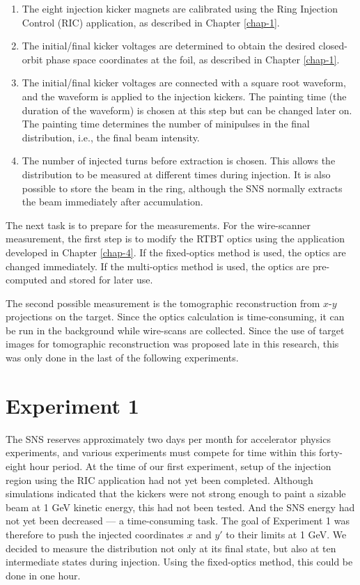 \begin{enumerate}
    \item
    The eight injection kicker magnets are calibrated using the Ring Injection Control (RIC) application, as described in Chapter \ref{chap-1}. 
    \item
    The initial/final kicker voltages are determined to obtain the desired closed-orbit phase space coordinates at the foil, as described in Chapter \ref{chap-1}.
    \item
    The initial/final kicker voltages are connected with a square root waveform, and the waveform is applied to the injection kickers. The painting time (the duration of the waveform) is chosen at this step but can be changed later on. The painting time determines the number of minipulses in the final distribution, i.e., the final beam intensity.
    \item
    The number of injected turns before extraction is chosen. This allows the distribution to be measured at different times during injection. It is also possible to store the beam in the ring, although the SNS normally extracts the beam immediately after accumulation.
\end{enumerate}
%
The next task is to prepare for the measurements. For the wire-scanner measurement, the first step is to modify the RTBT optics using the application developed in Chapter \ref{chap-4}. If the fixed-optics method is used, the optics are changed immediately. If the multi-optics method is used, the optics are pre-computed and stored for later use. 

The second possible measurement is the tomographic reconstruction from $x$-$y$ projections on the target. Since the optics calculation is time-consuming, it can be run in the background while wire-scans are collected. Since the use of target images for tomographic reconstruction was proposed late in this research, this was only done in the last of the following experiments.


\section{Experiment 1}

The SNS reserves approximately two days per month for accelerator physics experiments, and various experiments must compete for time within this forty-eight hour period. At the time of our first experiment, setup of the injection region using the RIC application had not yet been completed. Although simulations indicated that the kickers were not strong enough to paint a sizable beam at 1 GeV kinetic energy, this had not been tested. And the SNS energy had not yet been decreased — a time-consuming task. The goal of Experiment 1 was therefore to push the injected coordinates $x$ and $y'$ to their limits at 1 GeV. We decided to measure the distribution not only at its final state, but also at ten intermediate states during injection. Using the fixed-optics method, this could be done in one hour.


